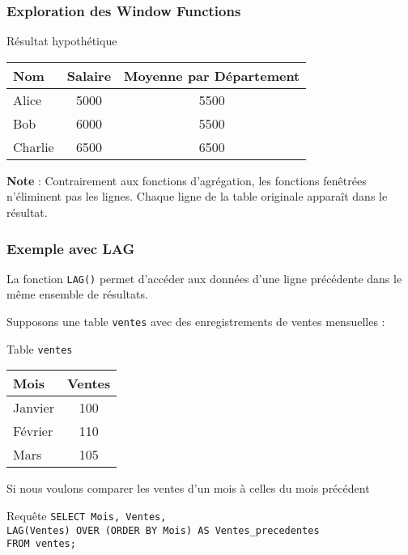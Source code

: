 \begin{frame}
  \frametitle{Exploration des Window Functions}

  \begin{exampleblock}{Résultat hypothétique}
    \begin{tabular}{l|c|c}
      \textbf{Nom} & \textbf{Salaire} & \textbf{Moyenne par Département} \\
      \hline
      Alice & 5000 & 5500 \\
      Bob & 6000 & 5500 \\
      Charlie & 6500 & 6500 \\
    \end{tabular}
  \end{exampleblock}

  \textbf{Note} : Contrairement aux fonctions d'agrégation, les fonctions fenêtrées n'éliminent pas les lignes. Chaque ligne de la table originale apparaît dans le résultat.
\end{frame}

\begin{frame}
  \frametitle{Exemple avec LAG}

  \small
  La fonction \texttt{LAG()} permet d'accéder aux données d'une ligne précédente dans le même ensemble de résultats.

  Supposons une table \texttt{ventes} avec des enregistrements de ventes mensuelles :

  \begin{block}{Table \texttt{ventes}}
    \begin{tabular}{l|c}
      \textbf{Mois} & \textbf{Ventes} \\
      \hline
      Janvier & 100 \\
      Février & 110 \\
      Mars & 105 \\
    \end{tabular}
  \end{block}

  Si nous voulons comparer les ventes d'un mois à celles du mois précédent

  \begin{block}{Requête}
    \texttt{SELECT Mois, Ventes, \\
    LAG(Ventes) OVER (ORDER BY Mois) AS Ventes\_precedentes \\
    FROM ventes;}
  \end{block}
\end{frame}

